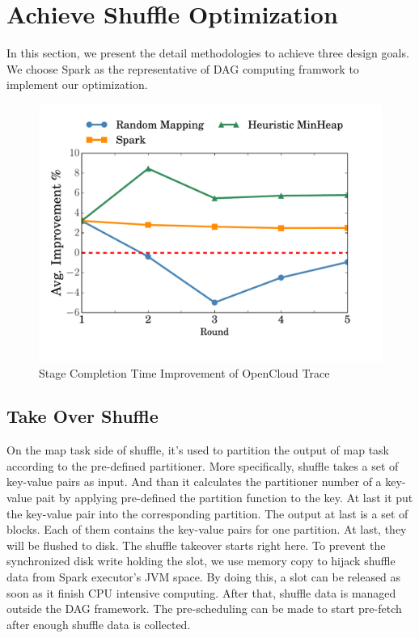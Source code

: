 \section{Achieve Shuffle Optimization}
In this section, we present the detail methodologies to achieve three design goals. 
We choose Spark as the representative of DAG computing framwork to implement our optimization.

\begin{figure}
	\centering
	\includegraphics[width=0.9\linewidth]{fig/sim}
	\caption{Stage Completion Time Improvement of OpenCloud Trace}
	\label{fig:sim}
\end{figure}

\subsection{Take Over Shuffle}
On the map task side of shuffle, it's used to partition the output of map task according to the pre-defined partitioner. More specifically, shuffle takes a set of key-value pairs as input. And than it calculates the partitioner number of a key-value pait by applying pre-defined the partition function to the key. At last it put the key-value pair into the corresponding partition. The output at last is a set of blocks. Each of them contains the key-value pairs for one partition. At last, they will be flushed to disk. The shuffle takeover starts right here. To prevent the synchronized disk write holding the slot, we use memory copy to hijack shuffle data from Spark executor's JVM space. By doing this, a slot can be released as soon as it finish CPU intensive computing. After that, shuffle data is managed outside the DAG framework. The pre-scheduling can be made to start pre-fetch after enough shuffle data is collected. 

